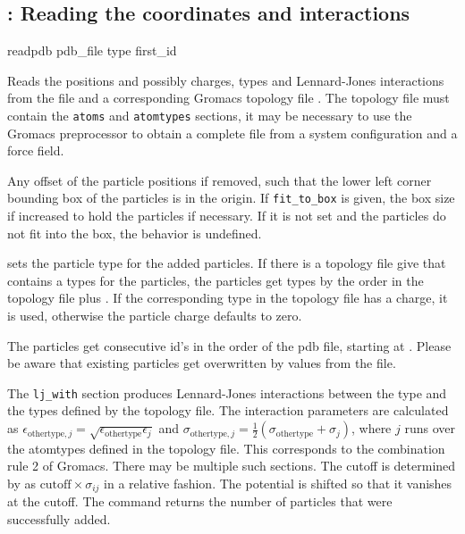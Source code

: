 \subsection{: Reading the coordinates and interactions}

\begin{essyntax}
  readpdb pdb_file  type  first_id   \\
   
\begin{features}
\end{features}
\end{essyntax}
Reads the positions and possibly charges, types and Lennard-Jones interactions
from the file  and a corresponding Gromacs topology file .
The topology file must contain the \verb|atoms| and \verb|atomtypes| sections,
it may be necessary to use the Gromacs preprocessor to obtain a complete file
from a system configuration and a force field.

Any offset of the particle positions if removed, such that the lower left
corner bounding box of the particles is in the origin. If \verb|fit_to_box| is
given, the box size if increased to hold the particles if necessary. If it is
not set and the particles do not fit into the box, the behavior is undefined.

 sets the particle type for the added particles. 
If there is a topology file give that contains a types for the particles, 
the particles get types by the order in the topology file plus .
If the corresponding type in the topology file has a charge, it is used,
otherwise the particle charge defaults to zero.

The particles get consecutive id's in the order of the pdb file, starting at
. Please be aware that existing particles get overwritten by
values from the file.

The \verb|lj_with| section produces Lennard-Jones interactions between the
type  and the types defined by the topology file. The
interaction parameters are calculated as $\epsilon_{\text{othertype},j} =
\sqrt{\epsilon_{\text{othertype}} \epsilon_j}$ and $\sigma_{\text{othertype},j}
=\frac{1}{2}\left( \sigma_{\text{othertype}} + \sigma_j \right)$, where $j$
runs over the atomtypes defined in the topology file. This corresponds to the
combination rule 2 of Gromacs. There may be multiple such sections.
The cutoff is determined by  as $\text{cutoff}\times \sigma_{ij}$ in a
relative fashion. The potential is shifted so that it vanishes at the cutoff.
The command returns the number of particles that were successfully added.


